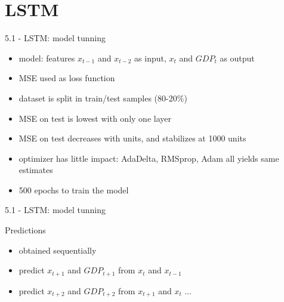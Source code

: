 \section{LSTM}

\begin{frame}{5.1 - LSTM: model tunning}
\begin{itemize}
	\item model: features $x_{t-1}$ and $x_{t-2}$ as input, $x_t$ and $GDP_t$ as output
	\item MSE used as loss function
	\item dataset is split in train/test samples (80-20\%)
	\item MSE on test is lowest with only one layer
	\item MSE on test decreases with units, and stabilizes at 1000 units
	\item optimizer has little impact: AdaDelta, RMSprop, Adam all yields same estimates
	\item 500 epochs to train the model
\end{itemize}	
\end{frame}

\begin{frame}{5.1 - LSTM: model tunning}
	\begin{block}{Predictions}
	\begin{itemize}
		\item obtained sequentially
		\item predict $x_{t+1}$ and $GDP_{t+1}$ from $x_{t}$ and $x_{t-1}$
		\item predict $x_{t+2}$ and $GDP_{t+2}$ from $x_{t+1}$ and $x_{t}$ ...
	\end{itemize}
\end{block}	
\end{frame}